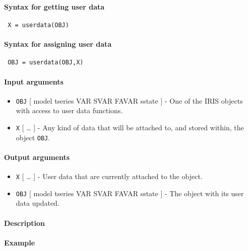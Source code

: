 


	\paragraph{Syntax for getting user data}
 
 \begin{verbatim}
 X = userdata(OBJ)
 \end{verbatim}
 
 \paragraph{Syntax for assigning user data}
 
 \begin{verbatim}
 OBJ = userdata(OBJ,X)
 \end{verbatim}
 
 \paragraph{Input arguments}
 
 \begin{itemize}
 \item
   \texttt{OBJ} {[} model \textbar{} tseries \textbar{} VAR \textbar{}
   SVAR \textbar{} FAVAR \textbar{} sstate {]} - One of the IRIS objects
   with access to user data functions.
 \item
   \texttt{X} {[} \ldots{} {]} - Any kind of data that will be attached
   to, and stored within, the object \texttt{OBJ}.
 \end{itemize}
 
 \paragraph{Output arguments}
 
 \begin{itemize}
 \item
   \texttt{X} {[} \ldots{} {]} - User data that are currently attached to
   the object.
 \item
   \texttt{OBJ} {[} model \textbar{} tseries \textbar{} VAR \textbar{}
   SVAR \textbar{} FAVAR \textbar{} sstate {]} - The object with its user
   data updated.
 \end{itemize}
 
 \paragraph{Description}
 
 \paragraph{Example}


